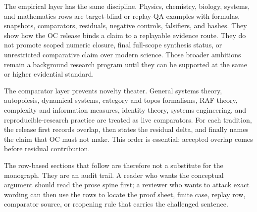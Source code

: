 The empirical layer has the same discipline. Physics, chemistry, biology, systems, and mathematics rows are target-blind or replay-QA examples with formulas, snapshots, comparators, residuals, negative controls, falsifiers, and hashes. They show how the OC release binds a claim to a replayable evidence route. They do not promote scoped numeric closure, final full-scope synthesis status, or unrestricted comparative claim over modern science. Those broader ambitions remain a background research program until they can be supported at the same or higher evidential standard.

The comparator layer prevents novelty theater. General systems theory, autopoiesis, dynamical systems, category and topos formalisms, RAF theory, complexity and information measures, identity theory, systems engineering, and reproducible-research practice are treated as live comparators. For each tradition, the release first records overlap, then states the residual delta, and finally names the claim that OC must not make. This order is essential: accepted overlap comes before residual contribution.

The row-based sections that follow are therefore not a substitute for the monograph. They are an audit trail. A reader who wants the conceptual argument should read the prose spine first; a reviewer who wants to attack exact wording can then use the rows to locate the proof sheet, finite case, replay row, comparator source, or reopening rule that carries the challenged sentence.
